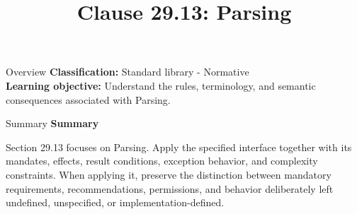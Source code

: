 \documentclass[10pt,letterpaper]{article}
\title{Clause 29.13: Parsing}
\author{}
\date{}
\begin{document}
\maketitle
\begin{CornellOverviewBox}{Overview}
\textbf{Classification:} Standard library - Normative\\[2pt]
\textbf{Learning objective:} Understand the rules, terminology, and semantic consequences associated with Parsing.
\end{CornellOverviewBox}\begin{CornellSummaryBox}{Summary}
{\sffamily\bfseries\color{Accent} Summary}\par\vspace{3pt}Section 29.13 focuses on Parsing. Apply the specified interface together with its mandates, effects, result conditions, exception behavior, and complexity constraints. When applying it, preserve the distinction between mandatory requirements, recommendations, permissions, and behavior deliberately left undefined, unspecified, or implementation-defined.
\end{CornellSummaryBox}
\end{document}
